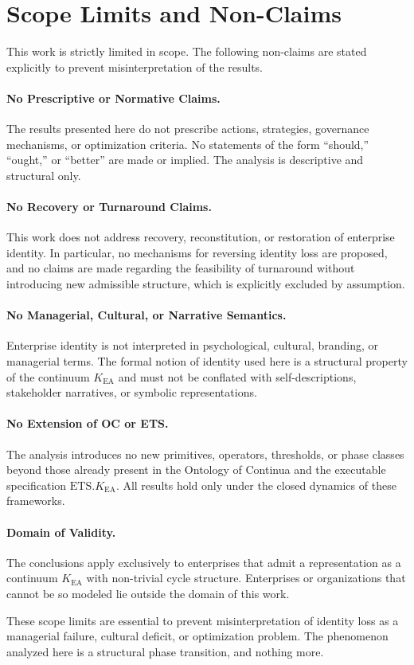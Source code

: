 ﻿\section{Scope Limits and Non-Claims}

This work is strictly limited in scope. The following non-claims are stated
explicitly to prevent misinterpretation of the results.

\paragraph{No Prescriptive or Normative Claims.}
The results presented here do not prescribe actions, strategies, governance
mechanisms, or optimization criteria. No statements of the form ``should,''
``ought,'' or ``better'' are made or implied. The analysis is descriptive and
structural only.

\paragraph{No Recovery or Turnaround Claims.}
This work does not address recovery, reconstitution, or restoration of
enterprise identity. In particular, no mechanisms for reversing identity loss
are proposed, and no claims are made regarding the feasibility of turnaround
without introducing new admissible structure, which is explicitly excluded by
assumption.

\paragraph{No Managerial, Cultural, or Narrative Semantics.}
Enterprise identity is not interpreted in psychological, cultural, branding, or
managerial terms. The formal notion of identity used here is a structural
property of the continuum $K_{\mathrm{EA}}$ and must not be conflated with
self-descriptions, stakeholder narratives, or symbolic representations.

\paragraph{No Extension of OC or ETS.}
The analysis introduces no new primitives, operators, thresholds, or phase
classes beyond those already present in the Ontology of Continua and the
executable specification $\mathrm{ETS}.K_{\mathrm{EA}}$. All results hold only
under the closed dynamics of these frameworks.

\paragraph{Domain of Validity.}
The conclusions apply exclusively to enterprises that admit a representation as
a continuum $K_{\mathrm{EA}}$ with non-trivial cycle structure. Enterprises or
organizations that cannot be so modeled lie outside the domain of this work.

These scope limits are essential to prevent misinterpretation of identity loss as
a managerial failure, cultural deficit, or optimization problem. The phenomenon
analyzed here is a structural phase transition, and nothing more.
